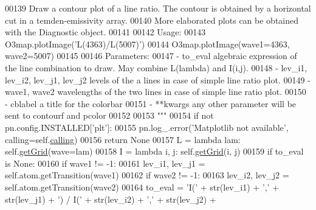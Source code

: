 \begin{DoxyCode}
00139 \textcolor{stringliteral}{        Draw a contour plot of a line ratio. The contour is obtained by a horizontal cut in a
       temden-emissivity array.}
00140 \textcolor{stringliteral}{        More elaborated plots can be obtained with the Diagnostic object.}
00141 \textcolor{stringliteral}{        }
00142 \textcolor{stringliteral}{        Usage:}
00143 \textcolor{stringliteral}{            O3map.plotImage('L(4363)/L(5007)')}
00144 \textcolor{stringliteral}{            O3map.plotImage(wave1=4363, wave2=5007)}
00145 \textcolor{stringliteral}{            }
00146 \textcolor{stringliteral}{        Parameters:}
00147 \textcolor{stringliteral}{            - to\_eval                         algebraic expression of the line combination to draw. May
       combine L(lambda) and I(i,j).}
00148 \textcolor{stringliteral}{            - lev\_i1, lev\_i2, lev\_j1, lev\_j2  levels of the a lines in case of simple line ratio plot.}
00149 \textcolor{stringliteral}{            - wave1, wave2                    wavelengths of the two lines in case of simple line ratio
       plot.}
00150 \textcolor{stringliteral}{            - cblabel                         a title for the colorbar}
00151 \textcolor{stringliteral}{            - **kwargs                        any other parameter will be sent to contourf and pcolor}
00152 \textcolor{stringliteral}{}
00153 \textcolor{stringliteral}{        """}
00154         \textcolor{keywordflow}{if} \textcolor{keywordflow}{not} pn.config.INSTALLED[\textcolor{stringliteral}{'plt'}]:
00155             pn.log\_.error(\textcolor{stringliteral}{'Matplotlib not available'}, calling=self.\hyperlink{classpyneb_1_1core_1_1emis_grid_1_1_emis_grid_a19820878261ee98513e0b755e688453f}{calling})
00156             \textcolor{keywordflow}{return} \textcolor{keywordtype}{None}
00157         L = \textcolor{keyword}{lambda} lam: self.\hyperlink{classpyneb_1_1core_1_1emis_grid_1_1_emis_grid_af9a9219e5ddfcfd53c52466e2c2deb44}{getGrid}(wave=lam)
00158         I = \textcolor{keyword}{lambda} i, j: self.\hyperlink{classpyneb_1_1core_1_1emis_grid_1_1_emis_grid_af9a9219e5ddfcfd53c52466e2c2deb44}{getGrid}(i, j)
00159         \textcolor{keywordflow}{if} to\_eval \textcolor{keywordflow}{is} \textcolor{keywordtype}{None}:
00160             \textcolor{keywordflow}{if} wave1 != -1:
00161                 lev\_i1, lev\_j1 = self.atom.getTransition(wave1)
00162             \textcolor{keywordflow}{if} wave2 != -1:
00163                 lev\_i2, lev\_j2 = self.atom.getTransition(wave2)
00164             to\_eval = \textcolor{stringliteral}{'I('} + str(lev\_i1) + \textcolor{stringliteral}{','} + str(lev\_j1) + \textcolor{stringliteral}{') / I('} + str(lev\_i2) + \textcolor{stringliteral}{','} + str(lev\_j2) +

\end{DoxyCode}
